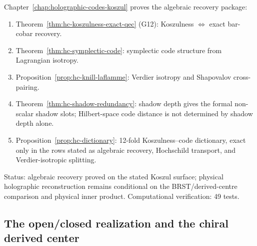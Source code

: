 \begin{remark}
\label{rem:concordance-g12-holographic-codes}
Chapter~\ref{chap:holographic-codes-koszul} proves the algebraic
recovery package:
\begin{enumerate}[label=\textup{(\alph*)}]
\item Theorem~\ref{thm:hc-koszulness-exact-qec} (G12):
 Koszulness $\Leftrightarrow$ exact bar-cobar recovery.
\item Theorem~\ref{thm:hc-symplectic-code}:
 symplectic code structure from Lagrangian isotropy.
\item Proposition~\ref{prop:hc-knill-laflamme}:
 Verdier isotropy and Shapovalov cross-pairing.
\item Theorem~\ref{thm:hc-shadow-redundancy}:
 shadow depth gives the formal non-scalar shadow slots; Hilbert-space
 code distance is not determined by shadow depth alone.
\item Proposition~\ref{prop:hc-dictionary}:
 12-fold Koszulness--code dictionary, exact only in the rows stated as
 algebraic recovery, Hochschild transport, and Verdier-isotropic
 splitting.
\end{enumerate}
Status: algebraic recovery proved on the stated Koszul surface;
physical holographic reconstruction remains conditional on the
BRST/derived-centre comparison and physical inner product.
Computational verification: 49 tests.
\end{remark}

\subsection{The open/closed realization and the chiral derived center}
\label{subsec:concordance-open-closed-realization}

